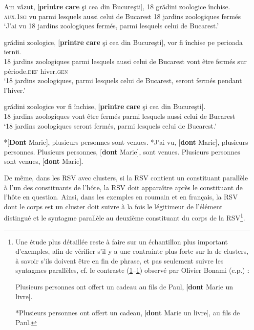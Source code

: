 \ex 
\gll *Am  văzut,  [\textbf{printre} \textbf{care} şi  cea  din  Bucureşti],  18  grădini zoologice  închise. \label{ch3:ex41b}\\
\textsc{aux.1sg}  vu  parmi  lesquels  aussi  celui  de  Bucarest  18  jardins zoologiques  fermés \\
\glt ‘J’ai vu 18 jardins zoologiques fermés, parmi lesquels celui de Bucarest.’ 

\ex 
{}  grădini  zoologice,  [\textbf{printre} \textbf{care} şi  cea  din  Bucureşti], vor fi închise pe  perioada  iernii. \label{ch3:ex41c}\\
18  jardins  zoologiques  parmi  lesquels  aussi  celui  de  Bucarest  vont  être fermés  sur  période.\textsc{def}  hiver.\textsc{gen} \\
\glt ‘18 jardins zoologiques, parmi lesquels celui de Bucarest, seront fermés pendant l’hiver.’ 

\ex 
{}  grădini  zoologice  vor  fi  închise,  [\textbf{printre} \textbf{care} şi  cea  din Bucureşti]. \label{ch3:ex41d}\\
18  jardins  zoologiques  vont  être  fermés  parmi  lesquels  aussi  celui  de Bucarest \\
\glt ‘18 jardins zoologiques seront fermés, parmi lesquels celui de Bucarest.’
\z 
\z


\ea \label{ch3:ex42}
\ea
*[\textbf{Dont} Marie], plusieurs personnes sont venues. \label{ch3:ex42a} 
\ex 
*J’ai vu, [\textbf{dont} Marie], plusieurs personnes. \label{ch3:ex42b}
\ex 
Plusieurs personnes, [\textbf{dont} Marie], sont venues. \label{ch3:ex42c}
\ex 
Plusieurs personnes sont venues, [\textbf{dont} Marie]. \label{ch3:ex42d}
\z 
\z

De même, dans les RSV avec clusters, si la RSV contient un constituant parallèle à l’un des constituants de l’hôte, la RSV doit apparaître après le constituant de l’hôte en question. Ainsi, dans les exemples  en roumain et  en français, la RSV dont le corps est un cluster doit suivre à la fois le légitimeur de l’élément distingué et le syntagme parallèle au deuxième constituant du corps de la RSV\footnote{ Une étude plus détaillée reste à faire sur un échantillon plus important d’exemples, afin de vérifier s’il y a une contrainte plus forte sur la  de clusters, à savoir s’ils doivent être en fin de phrase, et pas seulement suivre les syntagmes parallèles, cf. le contraste (\ref{ch3:fn9i}--\ref{ch3:fn9ii}) observé par Olivier Bonami (c.p.) :

\ea \label{ch3:fn9i}
Plusieurs personnes ont offert un cadeau au fils de Paul, [\textbf{dont} Marie un livre].
\z 

\ea \label{ch3:fn9ii}
*Plusieurs personnes ont offert un cadeau, [\textbf{dont} Marie un livre], au fils de Paul.
\z 
}.


